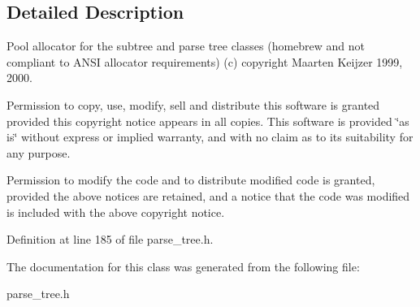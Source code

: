 \subsection{Detailed Description}
Pool allocator for the subtree and parse tree classes (homebrew and not compliant to ANSI allocator requirements) (c) copyright Maarten Keijzer 1999, 2000. 

Permission to copy, use, modify, sell and distribute this software is granted provided this copyright notice appears in all copies. This software is provided \char`\"{}as is\char`\"{} without express or implied warranty, and with no claim as to its suitability for any purpose.

Permission to modify the code and to distribute modified code is granted, provided the above notices are retained, and a notice that the code was modified is included with the above copyright notice. 



Definition at line 185 of file parse\_\-tree.h.

The documentation for this class was generated from the following file:\begin{CompactItemize}
\item 
parse\_\-tree.h\end{CompactItemize}
